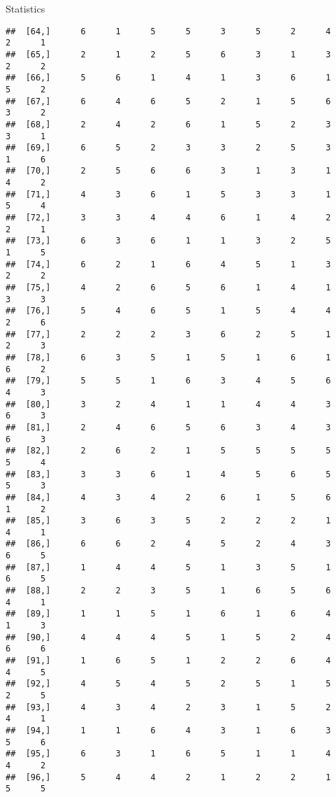 \documentclass[
  ignorenonframetext,
]{beamer}
\begin{document}
\begin{frame}[fragile]{Statistics}
\begin{verbatim}
##  [64,]      6      1      5      5      3      5      2      4      2      1
##  [65,]      2      1      2      5      6      3      1      3      2      2
##  [66,]      5      6      1      4      1      3      6      1      5      2
##  [67,]      6      4      6      5      2      1      5      6      3      2
##  [68,]      2      4      2      6      1      5      2      3      3      1
##  [69,]      6      5      2      3      3      2      5      3      1      6
##  [70,]      2      5      6      6      3      1      3      1      4      2
##  [71,]      4      3      6      1      5      3      3      1      5      4
##  [72,]      3      3      4      4      6      1      4      2      2      1
##  [73,]      6      3      6      1      1      3      2      5      1      5
##  [74,]      6      2      1      6      4      5      1      3      2      2
##  [75,]      4      2      6      5      6      1      4      1      3      3
##  [76,]      5      4      6      5      1      5      4      4      2      6
##  [77,]      2      2      2      3      6      2      5      1      2      3
##  [78,]      6      3      5      1      5      1      6      1      6      2
##  [79,]      5      5      1      6      3      4      5      6      4      3
##  [80,]      3      2      4      1      1      4      4      3      6      3
##  [81,]      2      4      6      5      6      3      4      3      6      3
##  [82,]      2      6      2      1      5      5      5      5      5      4
##  [83,]      3      3      6      1      4      5      6      5      5      3
##  [84,]      4      3      4      2      6      1      5      6      1      2
##  [85,]      3      6      3      5      2      2      2      1      4      1
##  [86,]      6      6      2      4      5      2      4      3      6      5
##  [87,]      1      4      4      5      1      3      5      1      6      5
##  [88,]      2      2      3      5      1      6      5      6      4      1
##  [89,]      1      1      5      1      6      1      6      4      1      3
##  [90,]      4      4      4      5      1      5      2      4      6      6
##  [91,]      1      6      5      1      2      2      6      4      4      5
##  [92,]      4      5      4      5      2      5      1      5      2      5
##  [93,]      4      3      4      2      3      1      5      2      4      1
##  [94,]      1      1      6      4      3      1      6      3      5      6
##  [95,]      6      3      1      6      5      1      1      4      4      2
##  [96,]      5      4      4      2      1      2      2      1      5      5

\end{verbatim}
\end{frame}
\end{document}
